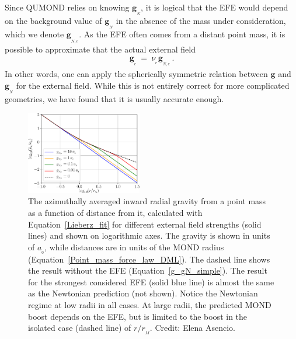 \documentclass[fleqn,usenatbib,useAMS,onecolumn]{mnras} %
\begin{document}
Since QUMOND relies on knowing $\bm{g}_{_N}$, it is logical that the EFE would depend on the background value of $\bm{g}_{_N}$ in the absence of the mass under consideration, which we denote $\bm{g}_{_{N,e}}$. As the EFE often comes from a distant point mass, it is possible to approximate that the actual external field
\begin{eqnarray}
	\bm{g}_{_e} ~=~ \nu_{_e} \bm{g}_{_{N,e}} \, .
\end{eqnarray}
In other words, one can apply the spherically symmetric relation between $\bm{g}$ and $\bm{g}_{_N}$ for the external field. While this is not entirely correct for more complicated geometries, we have found that it is usually accurate enough.

\begin{figure}
	\centering
	\includegraphics[width=0.45\textwidth]{Force_law_Lieberz}
	\caption{The azimuthally averaged inward radial gravity from a point mass as a function of distance from it, calculated with Equation~\ref{Lieberz_fit} for different external field strengths (solid lines) and shown on logarithmic axes. The gravity is shown in units of $a_{_0}$, while distances are in units of the MOND radius (Equation~\ref{Point_mass_force_law_DML}). The dashed line shows the result without the EFE (Equation~\ref{g_gN_simple}). The result for the strongest considered EFE (solid blue line) is almost the same as the Newtonian prediction (not shown). Notice the Newtonian regime at low radii in all cases. At large radii, the predicted MOND boost depends on the EFE, but is limited to the boost in the isolated case (dashed line) of $r/r_{_M}$. Credit: Elena Asencio.}
	\label{Force_law_Lieberz}
\end{figure}
\end{document}
